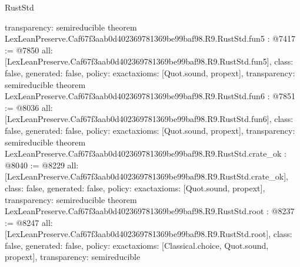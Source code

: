 \begin{lexlean}{RustStd}
\begin{coremodule}
{  transparency: semireducible
}
theorem LexLeanPreserve.Caf67f3aab0d402369781369be99baf98.R9.RustStd.fun5 : @7417 := @7850 {
  all: [LexLeanPreserve.Caf67f3aab0d402369781369be99baf98.R9.RustStd.fun5],
  class: false,
  generated: false,
  policy: exact{axioms: [Quot.sound, propext]},
  transparency: semireducible
}
theorem LexLeanPreserve.Caf67f3aab0d402369781369be99baf98.R9.RustStd.fun6 : @7851 := @8036 {
  all: [LexLeanPreserve.Caf67f3aab0d402369781369be99baf98.R9.RustStd.fun6],
  class: false,
  generated: false,
  policy: exact{axioms: [Quot.sound, propext]},
  transparency: semireducible
}
theorem LexLeanPreserve.Caf67f3aab0d402369781369be99baf98.R9.RustStd.crate_ok : @8040 := @8229 {
  all: [LexLeanPreserve.Caf67f3aab0d402369781369be99baf98.R9.RustStd.crate_ok],
  class: false,
  generated: false,
  policy: exact{axioms: [Quot.sound, propext]},
  transparency: semireducible
}
theorem LexLeanPreserve.Caf67f3aab0d402369781369be99baf98.R9.RustStd.root : @8237 := @8247 {
  all: [LexLeanPreserve.Caf67f3aab0d402369781369be99baf98.R9.RustStd.root],
  class: false,
  generated: false,
  policy: exact{axioms: [Classical.choice, Quot.sound, propext]},
  transparency: semireducible
}


\end{coremodule}
\end{lexlean}
